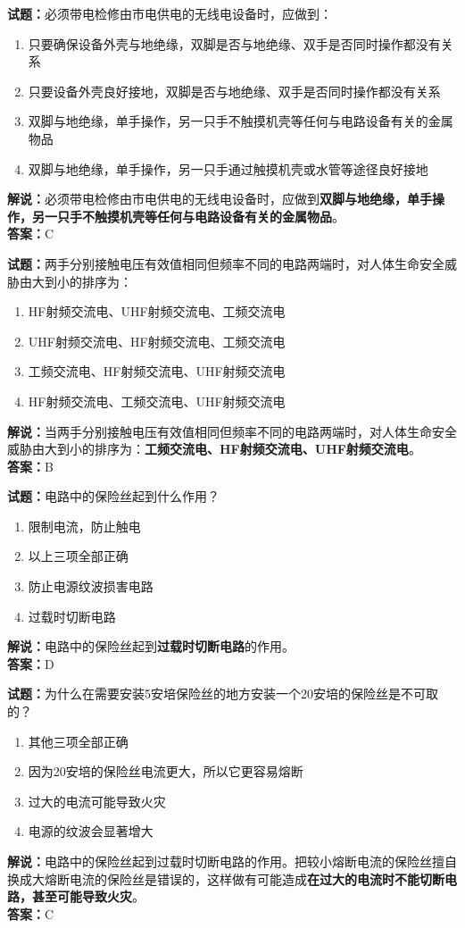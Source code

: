 \documentclass{ctexbook}
\begin{document}
\bigskip


\noindent\textbf{试题：}必须带电检修由市电供电的无线电设备时，应做到：
\begin{enumerate}[leftmargin=3em]
	\item 只要确保设备外壳与地绝缘，双脚是否与地绝缘、双手是否同时操作都没有关系
	\item 只要设备外壳良好接地，双脚是否与地绝缘、双手是否同时操作都没有关系
	\item 双脚与地绝缘，单手操作，另一只手不触摸机壳等任何与电路设备有关的金属物品
	\item 双脚与地绝缘，单手操作，另一只手通过触摸机壳或水管等途径良好接地
\end{enumerate}
\noindent\textbf{解说：}必须带电检修由市电供电的无线电设备时，应做到\textbf{双脚与地绝缘，单手操作，另一只手不触摸机壳等任何与电路设备有关的金属物品}。\\\noindent\textbf{答案：}C
\bigskip


\noindent\textbf{试题：}两手分别接触电压有效值相同但频率不同的电路两端时，对人体生命安全威胁由大到小的排序为：
\begin{enumerate}[leftmargin=3em]
	\item HF射频交流电、UHF射频交流电、工频交流电
	\item UHF射频交流电、HF射频交流电、工频交流电
	\item 工频交流电、HF射频交流电、UHF射频交流电
	\item HF射频交流电、工频交流电、UHF射频交流电
\end{enumerate}
\noindent\textbf{解说：}当两手分别接触电压有效值相同但频率不同的电路两端时，对人体生命安全威胁由大到小的排序为：\textbf{工频交流电、HF射频交流电、UHF射频交流电}。\\\noindent\textbf{答案：}B%

\bigskip


\noindent\textbf{试题：}电路中的保险丝起到什么作用？
\begin{enumerate}[leftmargin=3em]
	\item 限制电流，防止触电
	\item 以上三项全部正确
	\item 防止电源纹波损害电路
	\item 过载时切断电路
\end{enumerate}
\noindent\textbf{解说：}电路中的保险丝起到\textbf{过载时切断电路}的作用。\\\noindent\textbf{答案：}D
\bigskip


\noindent\textbf{试题：}为什么在需要安装5安培保险丝的地方安装一个20安培的保险丝是不可取的？
\begin{enumerate}[leftmargin=3em]
	\item 其他三项全部正确
	\item 因为20安培的保险丝电流更大，所以它更容易熔断
	\item 过大的电流可能导致火灾
	\item 电源的纹波会显著增大
\end{enumerate}
\noindent\textbf{解说：}电路中的保险丝起到过载时切断电路的作用。把较小熔断电流的保险丝擅自换成大熔断电流的保险丝是错误的，这样做有可能造成\textbf{在过大的电流时不能切断电路，甚至可能导致火灾}。\\\noindent\textbf{答案：}C%
\end{document}
